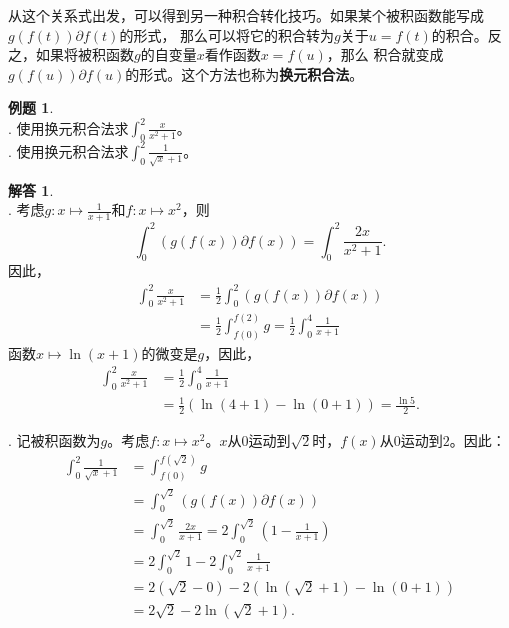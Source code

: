 \documentclass[12pt,UTF8]{ctexbook}
\theoremstyle{definition}
\newtheorem{et}{例题}[section]
\newtheorem*{so}{解答}
\theoremstyle{plain}
\begin{document}
从这个关系式出发，可以得到另一种积合转化技巧。如果某个被积函数能写成$g(f(t)) \partial f (t)$的形式，
那么可以将它的积合转为$g$关于$u = f(t)$的积合。反之，如果将被积函数$g$的自变量$x$看作函数$x = f(u)$，那么
积合就变成$g(f(u)) \partial f (u)$的形式。这个方法也称为\textbf{换元积合法}。

\begin{et}
    \mbox{} \\
    . 使用换元积合法求$\int_0^2 \frac{x}{x^2 + 1}$。 \\
    . 使用换元积合法求$\int_0^2 \frac{1}{\sqrt{x} + 1}$。
\end{et}

\begin{so}
    \mbox{} \\
    . 考虑$g: x\mapsto \frac{1}{x + 1}$和$f: x\mapsto x^2$，则
    $$ \int_0^2 \left( g(f(x)) \partial f (x) \right) = \int_0^2 \frac{2x}{x^2 + 1}. $$
    因此，
    \begin{align*}
        \int_0^2 \frac{x}{x^2 + 1} &= \frac{1}{2} \int_0^2 \left( g(f(x)) \partial f (x) \right) \\
        &= \frac{1}{2}\int_{f(0)}^{f(2)} g = \frac{1}{2}\int_0^4 \frac{1}{x + 1} 
    \end{align*}
    函数$x\mapsto \ln{(x + 1)}$的微变是$g$，因此，
    \begin{align*}
        \int_0^2 \frac{x}{x^2 + 1} &= \frac{1}{2}\int_0^4 \frac{1}{x + 1} \\
        &= \frac{1}{2}\left(\ln{(4 + 1)} - \ln{(0 + 1)}\right) = \frac{\ln{5}}{2}.
    \end{align*}

    . 记被积函数为$g$。考虑$f: x\mapsto x^2$。$x$从$0$运动到$\sqrt{2}$时，$f(x)$从$0$运动到$2$。因此：
    \begin{align*}
        \int_0^2 \frac{1}{\sqrt{x} + 1} &= \int_{f(0)}^{f(\sqrt{2})} g \\
        &= \int_0^{\sqrt{2}} \left( g(f(x)) \partial f (x) \right) \\
        &= \int_0^{\sqrt{2}} \frac{2x}{x + 1} = 2\int_0^{\sqrt{2}} \left( 1 - \frac{1}{x + 1} \right) \\
        &= 2\int_0^{\sqrt{2}} 1 - 2\int_0^{\sqrt{2}} \frac{1}{x + 1} \\
        &= 2(\sqrt{2} - 0) - 2 \left(\ln{(\sqrt{2} + 1)} - \ln{(0 + 1)}\right) \\
        &= 2\sqrt{2} - 2\ln{(\sqrt{2} + 1)}.
    \end{align*}
\end{so}
\end{document}
